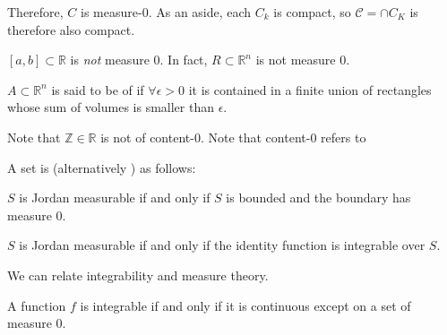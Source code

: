 \documentclass{article}
\numberwithin{equation}{section}
\begin{document}
Therefore, $C$ is measure-$0$. As an aside, each $C_k$ is compact, so $\mathcal{C} = \cap C_K$ is therefore also compact.
\begin{theorem}
    $[a,b] \subset \mathbb{R}$ is \textit{not} measure $0$. In fact, $R \subset \mathbb{R}^n$ is not measure $0$.
\end{theorem}
\begin{definition}
    $A\subset \mathbb{R}^n$ is said to be of  if $\forall \epsilon > 0$ it is contained in a finite union of rectangles whose sum of volumes is smaller than $\epsilon$.
\end{definition}
Note that $\mathbb{Z} \in \mathbb{R}$ is not of content-$0$. Note that content-$0$ refers to 

A set is  (alternatively ) as follows:
\begin{definition}
    $S$ is Jordan measurable if and only if $S$ is bounded and the boundary has measure $0$. 
\end{definition}
\begin{definition}
    $S$ is Jordan measurable if and only if the identity function is integrable over $S$.
\end{definition}
We can relate integrability and measure theory.
\begin{theorem}
    A function $f$ is integrable if and only if it is continuous except on a set of measure $0$.
\end{theorem}
\end{document}
